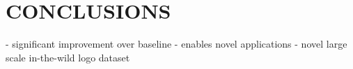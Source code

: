 \documentclass[a4paper,twoside]{article}
\begin{document}
\section{\uppercase{Conclusions}}
\label{sec:conclusion}
\noindent- significant improvement over baseline
- enables novel applications
- novel large scale in-the-wild logo dataset



\vfill

{\small
}

\vfill
\end{document}
